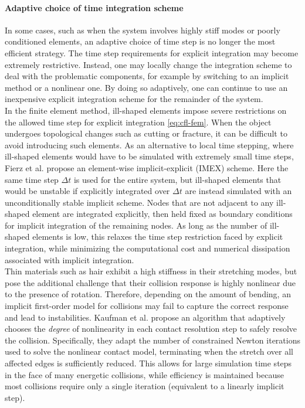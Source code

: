 \paragraph*{Adaptive choice of time integration scheme}
In some cases, such as when the system involves highly stiff modes or poorly conditioned elements, an adaptive choice of time step is no longer the most efficient strategy.
The time step requirements for explicit integration may become extremely restrictive.
Instead, one may locally change the integration scheme to deal with the problematic components, for example by switching to an implicit method or a nonlinear one.
By doing so adaptively, one can continue to use an inexpensive explicit integration scheme for the remainder of the system.
\\
In the finite element method, ill-shaped elements impose severe restrictions on the allowed time step for explicit integration \eqref{eq:cfl-fem}.
When the object undergoes topological changes such as cutting or fracture, it can be difficult to avoid introducing such elements.
As an alternative to local time stepping, where ill-shaped elements would have to be simulated with extremely small time steps, Fierz et al. \cite{Fierz2011} propose an element-wise implicit-explicit (IMEX) scheme.
Here the same time step $\Delta t$ is used for the entire system, but ill-shaped elements that would be unstable if explicitly integrated over $\Delta t$ are instead simulated with an unconditionally stable implicit scheme.
Nodes that are not adjacent to any ill-shaped element are integrated explicitly, then held fixed as boundary conditions for implicit integration of the remaining nodes.
As long as the number of ill-shaped elements is low, this relaxes the time step restriction faced by explicit integration, while minimizing the computational cost and numerical dissipation associated with implicit integration.
\\
Thin materials such as hair exhibit a high stiffness in their stretching modes, but pose the additional challenge that their collision response is highly nonlinear due to the presence of rotation.
Therefore, depending on the amount of bending, an implicit first-order model for collisions may fail to capture the correct response and lead to instabilities.
Kaufman et al. \cite{Kaufman2014} propose an algorithm that adaptively chooses the \emph{degree} of nonlinearity in each contact resolution step to safely resolve the collision.
Specifically, they adapt the number of constrained Newton iterations used to solve the nonlinear contact model, terminating when the stretch over all affected edges is sufficiently reduced.
This allows for large simulation time steps in the face of many energetic collisions, while efficiency is maintained because most collisions require only a single iteration (equivalent to a linearly implicit step).

